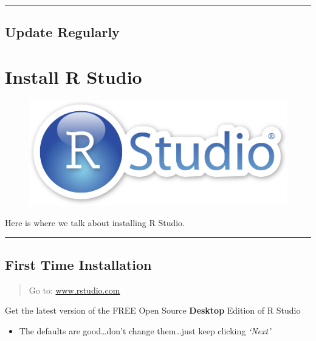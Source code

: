 \documentclass[]{book}
\providecommand{\tightlist}{%
  \setlength{\itemsep}{0pt}\setlength{\parskip}{0pt}}
\theoremstyle{definition}
\theoremstyle{definition}
\theoremstyle{definition}
\theoremstyle{remark}
\begin{document}
\begin{center}\rule{0.5\linewidth}{\linethickness}\end{center}

\section{Update Regularly}\label{update-regularly}

\chapter{Install R Studio}\label{install-r-studio}

\begin{figure}
\centering
\includegraphics{img/rstudiosticker.png}
\caption{}
\end{figure}

Here is where we talk about installing R Studio.

\begin{center}\rule{0.5\linewidth}{\linethickness}\end{center}

\section{First Time Installation}\label{first-time-installation-1}

\begin{quote}
Go to: \href{http://www.rstudio.com}{www.rstudio.com}
\end{quote}

Get the latest version of the FREE Open Source \textbf{Desktop} Edition
of R Studio

\begin{itemize}
\tightlist
\item
  The defaults are good\ldots{}don't change them\ldots{}just keep
  clicking \emph{`Next'}
\end{itemize}
\end{document}
